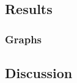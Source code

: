 \documentclass[fleqn,10pt]{SelfArx} %
\begin{document}
\subsection{Results}

\subsubsection{Graphs}

\subsection{Discussion}





% 
% 

\end{document}
